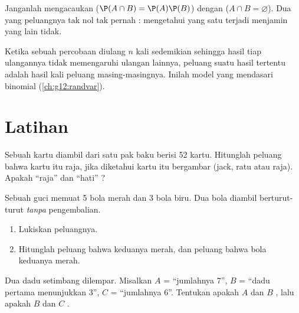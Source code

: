 \begin{remark}
Janganlah mengacaukan \emph{} ($\P(A\cap B) = \P(A)\P(B)$) dengan
\emph{} ($A \cap B = \varnothing$). Dua   yang
peluangnya tak nol tak pernah : mengetahui yang satu terjadi menjamin
yang lain tidak.
\end{remark}

\begin{definition}\label{def:g12:condprob:repet}
Ketika sebuah percobaan diulang $n$ kali sedemikian sehingga hasil tiap ulangannya
tidak memengaruhi ulangan lainnya, peluang suatu  hasil tertentu
adalah hasil kali peluang masing-masingnya. Inilah model
yang mendasari  binomial (\cref{ch:g12:randvar}).
\end{definition}

\section{Latihan}

\begin{exercise}[$\star$]\label{exo:g12:condprob:1}
Sebuah kartu diambil dari satu pak baku berisi 52 kartu. Hitunglah peluang bahwa
kartu itu raja, jika diketahui kartu itu bergambar (jack, ratu atau raja). Apakah
 ``raja'' dan ``hati'' ?
\end{exercise}

\begin{exercise}[$\star$]\label{exo:g12:condprob:2}
Sebuah guci memuat 5 bola merah dan 3 bola biru. Dua bola diambil berturut-turut
\emph{tanpa} pengembalian.
\begin{enumerate}
  \item Lukiskan  peluangnya.
  \item Hitunglah peluang bahwa keduanya merah, dan peluang bahwa
        bola keduanya merah.
\end{enumerate}
\end{exercise}

\begin{exercise}[$\star$]\label{exo:g12:condprob:3}
Dua dadu setimbang dilempar. Misalkan $A$ = ``jumlahnya $7$'', $B$ = ``dadu
pertama menunjukkan $3$'', $C$ = ``jumlahnya $6$''. Tentukan apakah $A$ dan $B$
, lalu apakah $B$ dan $C$ .
\end{exercise}

